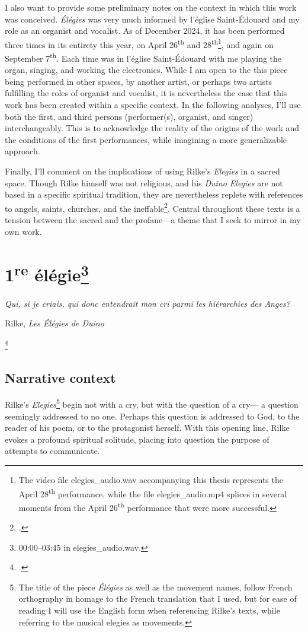\documentclass[12pt,twoside,maitrise]{dms_ks}
\theoremstyle{definition}
\begin{document}
{I also want to provide some preliminary notes on the context in which this work was conceived. 
\textit{Élégies} was very much informed by l'église Saint-Édouard and my role as an organist and vocalist. 
As of December 2024, it has been performed three times in its entirety this year, on April 26\textsuperscript{th} and 28\textsuperscript{th}\footnote{The video file elegies\_audio.wav accompanying this thesis represents the April 28\textsuperscript{th} performance, while the file elegies\_audio.mp4 splices in several moments from the April 26\textsuperscript{th} performance that were more successful.}, and again on September 7\textsuperscript{th}.
Each time was in l'église Saint-Édouard with me playing the organ, singing, and working the electronics.
While I am open to the this piece being performed in other spaces, by another artist, or perhaps two artists fulfilling the roles of organist and vocalist, it is nevertheless the case that this work has been created within a specific context. 
In the following analyses, I'll use both the first, and third persons (performer(s), organist, and singer) interchangeably. 
This is to acknowledge the reality of the origins of the work and the conditions of the first performances, while imagining a more generalizable approach.  

Finally, I'll comment on the implications of using Rilke's \textit{Elegies} in a sacred space. 
Though Rilke himself was not religious, and his \textit{Duino Elegies} are not based in a specific spiritual tradition, they are nevertheless replete with references to angels, saints, churches, and the ineffable\footcite[147]{gass_reading_2013}.
Central throughout these texts is a tension between the sacred and the profane---a theme that I seek to mirror in my own work. 

\section{1\textsuperscript{re} élégie\footnote{00:00--03:45 in elegies\_audio.wav.}}

\epigraph{\textit{Qui, si je criais, qui donc entendrait mon cri parmi les hiérarchies des Anges?}}{Rilke, \textit{Les Élégies de Duino}\protect\footnotemark}

\footcitetext[9]{rilke_egies_1986}

\subsection{Narrative context}
Rilke's \textit{Elegies}\footnote{The title of the piece \textit{Élégies} as well as the movement names, follow French orthography in homage to the French translation that I used, but for ease of reading I will use the English form when referencing Rilke's texts, while referring to the musical elegies as movements.} begin not with a cry, but with the question of a cry--- a question seemingly addressed to no one.
Perhaps this question is addressed to God, to the reader of his poem, or to the protagonist herself.
With this opening line, Rilke evokes a profound spiritual solitude, placing into question the purpose of attempts to communicate.

}
\end{document}
